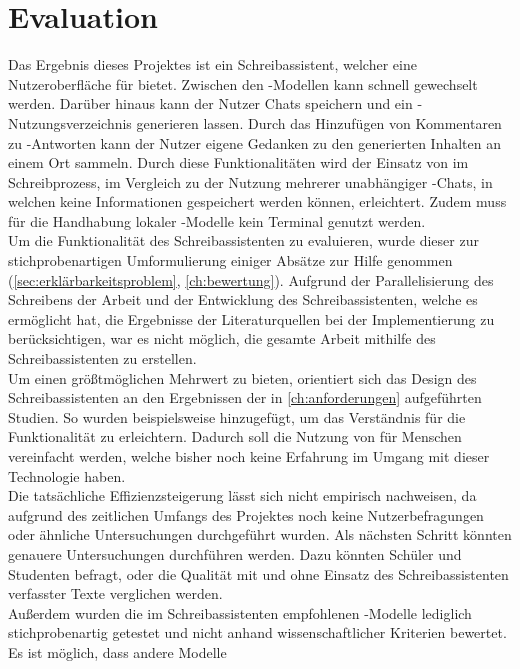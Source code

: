 \documentclass[../main.tex]{subfiles}
\begin{document}
\section{Evaluation}
Das Ergebnis dieses Projektes ist ein Schreibassistent, welcher eine Nutzeroberfläche für  bietet.
Zwischen den -Modellen kann schnell gewechselt werden. Darüber hinaus kann der Nutzer Chats speichern und ein -Nutzungsverzeichnis generieren lassen. Durch das Hinzufügen von Kommentaren 
zu -Antworten kann der Nutzer eigene Gedanken zu den generierten Inhalten an einem Ort sammeln. Durch diese Funktionalitäten wird der Einsatz von  im Schreibprozess, im Vergleich 
zu der Nutzung mehrerer unabhängiger -Chats, in welchen keine Informationen gespeichert werden können, erleichtert. Zudem muss für die Handhabung lokaler -Modelle kein Terminal genutzt werden. \\ 
Um die Funktionalität des Schreibassistenten zu evaluieren, wurde dieser zur stichprobenartigen Umformulierung einiger Absätze zur Hilfe genommen (\autoref{sec:erklärbarkeitsproblem}, \autoref{ch:bewertung}). Aufgrund der Parallelisierung des Schreibens der Arbeit und der Entwicklung des Schreibassistenten, welche es ermöglicht hat, die Ergebnisse der Literaturquellen bei der 
Implementierung zu berücksichtigen, war es nicht möglich, die gesamte Arbeit mithilfe des Schreibassistenten zu erstellen. \\
Um einen größtmöglichen Mehrwert zu bieten, orientiert sich das Design des Schreibassistenten an den Ergebnissen der in \autoref{ch:anforderungen} aufgeführten Studien. So wurden beispielsweise 
 hinzugefügt, um das Verständnis für die Funktionalität zu erleichtern. Dadurch soll die Nutzung von  für Menschen vereinfacht werden, welche bisher noch keine Erfahrung im 
Umgang mit dieser Technologie haben.\\
Die tatsächliche Effizienzsteigerung lässt sich nicht empirisch nachweisen, da aufgrund des zeitlichen Umfangs des Projektes noch keine Nutzerbefragungen oder ähnliche Untersuchungen durchgeführt 
wurden. Als nächsten Schritt könnten genauere Untersuchungen durchführen werden. Dazu könnten Schüler und Studenten befragt, oder die Qualität mit und ohne 
Einsatz des Schreibassistenten verfasster Texte verglichen werden.\\ 
Außerdem wurden die im Schreibassistenten empfohlenen -Modelle lediglich stichprobenartig getestet und nicht anhand wissenschaftlicher Kriterien bewertet. Es ist möglich, dass andere Modelle
\end{document}
